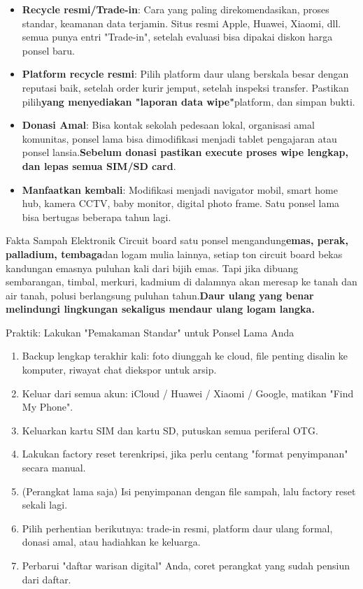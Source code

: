 \begin{itemize}
  \item \textbf{Recycle resmi/Trade-in}: Cara yang paling direkomendasikan, proses standar, keamanan data terjamin. Situs resmi Apple, Huawei, Xiaomi, dll. semua punya entri "Trade-in", setelah evaluasi bisa dipakai diskon harga ponsel baru.
  \item \textbf{Platform recycle resmi}: Pilih platform daur ulang berskala besar dengan reputasi baik, setelah order kurir jemput, setelah inspeksi transfer. Pastikan pilih\textbf{yang menyediakan "laporan data wipe"}platform, dan simpan bukti.
  \item \textbf{Donasi Amal}: Bisa kontak sekolah pedesaan lokal, organisasi amal komunitas, ponsel lama bisa dimodifikasi menjadi tablet pengajaran atau ponsel lansia.\textbf{Sebelum donasi pastikan execute proses wipe lengkap, dan lepas semua SIM/SD card}.
  \item \textbf{Manfaatkan kembali}: Modifikasi menjadi navigator mobil, smart home hub, kamera CCTV, baby monitor, digital photo frame. Satu ponsel lama bisa bertugas beberapa tahun lagi.
\end{itemize}

\begin{tcbinfo}{Fakta Sampah Elektronik}
Circuit board satu ponsel mengandung\textbf{emas, perak, palladium, tembaga}dan logam mulia lainnya, setiap ton circuit board bekas kandungan emasnya puluhan kali dari bijih emas. Tapi jika dibuang sembarangan, timbal, merkuri, kadmium di dalamnya akan meresap ke tanah dan air tanah, polusi berlangsung puluhan tahun.\textbf{Daur ulang yang benar melindungi lingkungan sekaligus mendaur ulang logam langka.}

\end{tcbinfo}

\begin{tcbpractice}{Praktik: Lakukan "Pemakaman Standar" untuk Ponsel Lama Anda}
\begin{enumerate}
  \item Backup lengkap terakhir kali: foto diunggah ke cloud, file penting disalin ke komputer, riwayat chat diekspor untuk arsip.
  \item Keluar dari semua akun: iCloud / Huawei / Xiaomi / Google, matikan "Find My Phone".
  \item Keluarkan kartu SIM dan kartu SD, putuskan semua periferal OTG.
  \item Lakukan factory reset terenkripsi, jika perlu centang "format penyimpanan" secara manual.
  \item (Perangkat lama saja) Isi penyimpanan dengan file sampah, lalu factory reset sekali lagi.
  \item Pilih perhentian berikutnya: trade-in resmi, platform daur ulang formal, donasi amal, atau hadiahkan ke keluarga.
  \item Perbarui "daftar warisan digital" Anda, coret perangkat yang sudah pensiun dari daftar.
\end{enumerate}

\end{tcbpractice}

